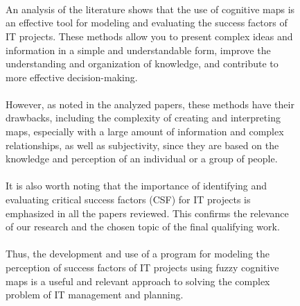 \documentclass{article}
\begin{document}
\begin{figure}[!t]
\begin{minipage}{0.49\textwidth}
            ~\\
            ~\\
            ~\\
            ~\\
            ~\\
            ~\\
            ~\\
            ~\\
            ~\\
            ~\\
            ~\\
            ~\\
        \end{minipage}
    \end{figure}
    \newpage
    \begin{figure}[!t]
        \fontsize{8}{7}\selectfont
        \begin{minipage}{0.49\textwidth}
            ~\\
            An analysis of the literature shows that the use of cognitive maps is an effective tool for modeling and evaluating the success factors of IT projects. These methods allow you to present complex ideas and information in a simple and understandable form, improve the understanding and organization of knowledge, and contribute to more effective decision-making.\\
            ~\\
            However, as noted in the analyzed papers, these methods have their drawbacks, including the complexity of creating and interpreting maps, especially with a large amount of information and complex relationships, as well as subjectivity, since they are based on the knowledge and perception of an individual or a group of people.\\
            ~\\
            It is also worth noting that the importance of identifying and evaluating critical success factors (CSF) for IT projects is emphasized in all the papers reviewed. This confirms the relevance of our research and the chosen topic of the final qualifying work.\\
            ~\\
            Thus, the development and use of a program for modeling the perception of success factors of IT projects using fuzzy cognitive maps is a useful and relevant approach to solving the complex problem of IT management and planning.\\
            \begin{center}

\end{center}
\end{minipage}
\end{figure}
\end{document}

